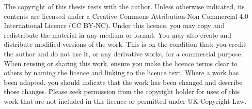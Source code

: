 The copyright of this thesis rests with the author. Unless otherwise
indicated, its contents are licensed under a Creative Commons Attribution-Non
Commercial 4.0 International Licence (CC BY-NC). Under this licence, you may
copy and redistribute the material in any medium or format. You may also
create and distribute modified versions of the work. This is on the condition
that: you credit the author and do not use it, or any derivative works, for a
commercial purpose. When reusing or sharing this work, ensure you make the
licence terms clear to others by naming the licence and linking to the licence
text. Where a work has been adapted, you should indicate that the work has
been changed and describe those changes. Please seek permission from the
copyright holder for uses of this work that are not included in this licence
or permitted under UK Copyright Law.